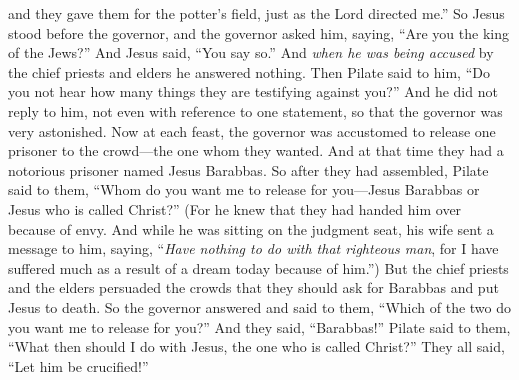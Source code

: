 \begin{biblechapter}
\verse and they gave them for the potter’s field, just as the Lord directed me.”
 So Jesus stood before the governor, and the governor asked him, saying, “Are you the king of the Jews?” And Jesus said, “You say so.”
\verse And \textit{when he was being accused} by the chief priests and elders he answered nothing.
\verse Then Pilate said to him, “Do you not hear how many things they are testifying against you?”
\verse And he did not reply to him, not even with reference to one statement, so that the governor was very astonished.
 Now at each feast, the governor was accustomed to release one prisoner to the crowd—the one whom they wanted.
\verse And at that time they had a notorious prisoner named Jesus Barabbas.
\verse So after they had assembled, Pilate said to them, “Whom do you want me to release for you—Jesus Barabbas or Jesus who is called Christ?”
\verse (For he knew that they had handed him over because of envy.
\verse And while he was sitting on the judgment seat, his wife sent a message to him, saying, “\textit{Have nothing to do with that righteous man}, for I have suffered much as a result of a dream today because of him.”)
\verse But the chief priests and the elders persuaded the crowds that they should ask for Barabbas and put Jesus to death.
\verse So the governor answered and said to them, “Which of the two do you want me to release for you?” And they said, “Barabbas!”
\verse Pilate said to them, “What then should I do with Jesus, the one who is called Christ?” They all said, “Let him be crucified!”

\end{biblechapter}
